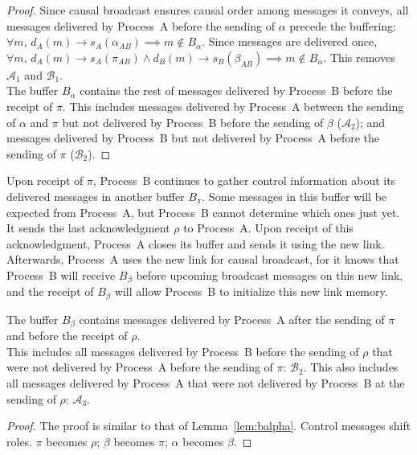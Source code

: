 \begin{proof}
  Since causal broadcast ensures causal order among messages it conveys, all
  messages delivered by Process~A before the sending of $\alpha$ precede the
  buffering:
  $\forall m,\, d_A(m) \rightarrow s_A(\alpha_{AB}) \implies m \not \in
  B_\alpha$.
  Since messages are delivered once,
  $\forall m,\, d_A(m) \rightarrow s_A(\pi_{AB}) \wedge d_B(m) \rightarrow
  s_B(\beta_{AB}) \implies m \not \in B_\alpha$.
  This removes $\mathcal{A}_1$ and $\mathcal{B}_1$.\\
  The buffer $B_\alpha$ contains the rest of messages delivered by Process~B
  before the receipt of $\pi$. This includes messages delivered by Process~A
  between the sending of $\alpha$ and $\pi$ but not delivered by Process~B
  before the sending of $\beta$ ($\mathcal{A}_2$); and messages delivered by
  Process~B but not delivered by Process~A before the sending of $\pi$
  ($\mathcal{B}_2$).
\end{proof}

\noindent Upon receipt of $\pi$, Process~B continues to gather control information about
its delivered messages in another buffer $B_\pi$. Some messages in this buffer
will be expected from Process~A, but Process~B cannot determine which ones just
yet. It sends the last acknowledgment $\rho$ to Process~A. Upon receipt of this
acknowledgment, Process~A closes its buffer and sends it using the new
link. Afterwards, Process~A uses the new link for causal broadcast, for it knows
that Process~B will receive $B_\beta$ before upcoming broadcast messages on this
new link, and the receipt of $B_\beta$ will allow Process~B to initialize this
new link memory.


\begin{lemma}
  The buffer $B_\beta$ contains messages delivered by Process~A after the
  sending of $\pi$ and before the receipt of $\rho$.\\
  This includes all messages delivered by Process~B before the sending of
  $\rho$ that were not delivered by Process~A before the sending of $\pi$:
  $\mathcal{B}_2$. This also includes all messages delivered by Process~A that
  were not delivered by Process~B at the sending of $\rho$: $\mathcal{A}_3$.
\end{lemma}
  
\begin{proof}
  The proof is similar to that of Lemma~\ref{lem:balpha}. Control messages
  shift roles. $\pi$ becomes $\rho$; $\beta$ becomes $\pi$; $\alpha$ becomes
  $\beta$.
\end{proof}

